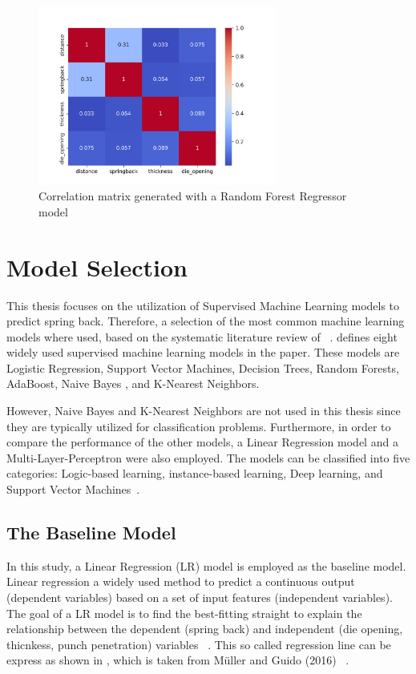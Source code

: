 {\begin{figure}[H]
    \begin{tcolorbox}[arc=0pt,boxrule=0.5pt]
        \centering
        \includegraphics[width=0.7\textwidth]{chap4/images/correlation_matrix}
    \end{tcolorbox}
    \caption{Correlation matrix generated with a Random Forest Regressor model}
    \label{fig:correlation_matrix}
\end{figure}


\section{Model Selection}\label{sec:model-selection}
This thesis focuses on the utilization of Supervised Machine Learning models to predict
spring back.
Therefore, a selection of the most common machine learning models where used, based on
the systematic literature review of
~\cite{dridi2021supervised}.
\cite{dridi2021supervised} defines eight widely used supervised machine learning models in the paper.
These models are Logistic Regression, Support Vector Machines, Decision Trees, Random Forests, AdaBoost, Naive Bayes
, and K-Nearest Neighbors.

However, Naive Bayes and K-Nearest Neighbors are not used in this thesis since they are typically
utilized for classification problems.
Furthermore, in order to compare the performance of the other models, a Linear Regression model
and a Multi-Layer-Perceptron were also employed.
The models can be classified into five categories: Logic-based learning, instance-based learning, Deep learning, and
Support Vector Machines~\cite[p. 8]{dridi2021supervised}.

\subsection{The Baseline Model}\label{subsec:regression-models}
In this study, a Linear Regression (LR) model is employed as the baseline model.
Linear regression a widely used method to predict a continuous output (dependent variables) based on a set
of input features (independent variables).
The goal of a \ac{LR} model is to find the best-fitting straight to explain the relationship between the dependent
(spring back) and independent (die opening, thicnkess, punch penetration)
variables
~\cite[pp. 45--46]{muller_introductionmachinelearning_2016}.
This so called regression line can be express as shown in , which is taken from
Müller and Guido (2016)
~\cite[p. 45]{muller_introductionmachinelearning_2016}.

}
